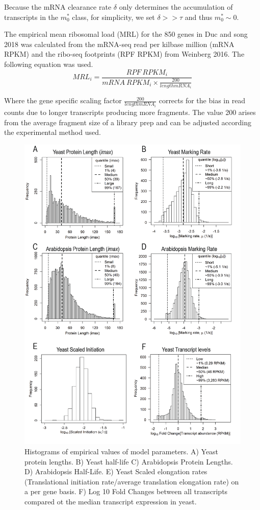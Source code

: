 \documentclass[review]{elsarticle}
\begin{document}
Because the mRNA clearance rate $\delta$ only determines the accumulation of transcripts in the  $m_0^*$  class, for simplicity, we set $\delta >> \tau$ and thus  $m_0^* \sim 0$.
 
The empirical mean ribosomal load (MRL) for the 850 genes in Duc and song 2018 was calculated from the mRNA-seq read per kilbase million (mRNA RPKM) and the ribo-seq footprints (RPF RPKM) from Weinberg 2016. The following equation was used.
\begin{equation}\label{eq:MRL}
	MRL_i = \frac{RPF\: RPKM_i}{mRNA\: RPKM_i \times \frac{200}{length mRNA_i}}
\end{equation}

Where the gene specific scaling factor $\frac{200}{length mRNA_i}$ corrects for the bias in read counts due to longer transcripts producing more fragments. The value 200 arises from the average fragment size of a library prep and can be adjusted according the experimental method used.

\begin{figure}[!ht]
\centering
\includegraphics[width=120mm]{Images/2023-07-04_parameter_histograms.png}
\caption{Histograms of empirical values of model parameters. A) Yeast protein lengths. B) Yeast half-life C) Arabidopsis Protein Lengths. D) Arabidopsis Half-Life. E) Yeast Scaled elongation rates (Translational initiation rate/average translation elongation rate) on a per gene basis. F) Log 10 Fold Changes between all transcripts compared ot the median transcript expression in yeast. }
\end{figure}
\clearpage		
\end{document}
